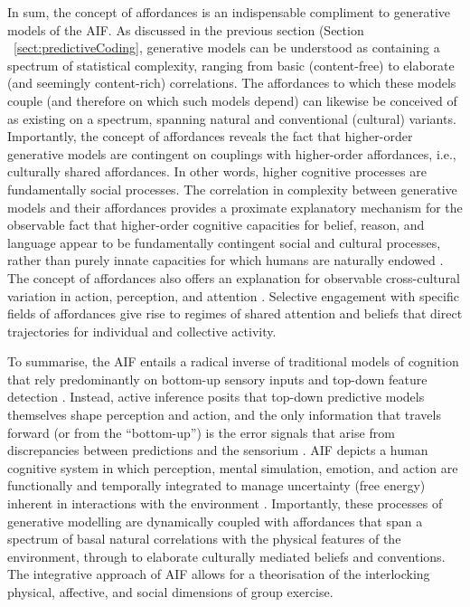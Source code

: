 \begin{CJK}{UTF8}{gbsn}
In sum, the concept of affordances is an indispensable compliment to generative models of the AIF.  As discussed in the previous section (Section ~\ref{sect:predictiveCoding}, generative models can be understood as containing a spectrum of statistical complexity, ranging from basic (content-free) to elaborate (and seemingly content-rich) correlations.  The affordances to which these models couple (and therefore on which such models depend) can likewise be conceived of as existing on a spectrum, spanning natural and conventional (cultural) variants.  Importantly, the concept of affordances reveals the fact that higher-order generative models are contingent on couplings with higher-order affordances, i.e., culturally shared affordances.  In other words, higher cognitive processes are fundamentally social processes.   The correlation in complexity between generative models and their affordances provides a proximate explanatory mechanism for the observable fact that higher-order cognitive capacities for belief, reason, and language appear to be fundamentally contingent social and cultural processes, rather than purely innate capacities for which humans are naturally endowed \citep{Sperber1997,Henrich2015}.  The concept of affordances also offers an explanation for observable cross-cultural variation in action, perception, and attention \citep[cf.][]{Nisbett2003}.  Selective engagement with specific fields of affordances give rise to regimes of shared attention and beliefs that direct trajectories for individual and collective activity.


To summarise, the AIF entails a radical inverse of traditional models of cognition that rely predominantly on bottom-up sensory inputs and top-down feature detection \citep[e.g.,][]{Marr1985}. Instead, active inference posits that top-down predictive models themselves shape perception and action, and the only information that travels forward (or from the ``bottom-up'') is the error signals that arise from discrepancies between predictions and the sensorium \citep{Pickering2014}.  AIF depicts a human cognitive system in which perception, mental simulation, emotion, and action are functionally and temporally integrated to manage uncertainty (free energy) inherent in interactions with the environment \citep{Clark2013}.  Importantly, these processes of generative modelling are dynamically coupled with affordances that span a spectrum of basal natural correlations with the physical features of the environment, through to elaborate culturally mediated beliefs and conventions.  The integrative approach of AIF allows for a theorisation of the interlocking physical, affective, and social dimensions of group exercise.



\end{CJK}
